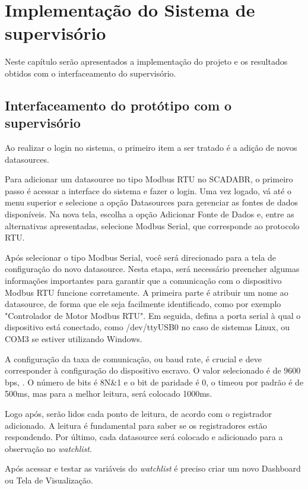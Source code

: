 \chapter[Implementação do sistema de supervisório]{Implementação do Sistema de supervisório}

Neste capítulo serão apresentados a implementação do projeto e os resultados obtidos com o interfaceamento do supervisório.


\section{Interfaceamento do protótipo com o supervisório}

Ao realizar o login no sistema, o primeiro item a ser tratado é a adição de novos datasources.

Para adicionar um datasource no tipo Modbus RTU no SCADABR, o primeiro passo é acessar a interface do sistema e fazer o login. Uma vez logado, vá até o menu superior e selecione a opção Datasources para gerenciar as fontes de dados disponíveis. Na nova tela, escolha a opção Adicionar Fonte de Dados e, entre as alternativas apresentadas, selecione Modbus Serial, que corresponde ao protocolo RTU.

Após selecionar o tipo Modbus Serial, você será direcionado para a tela de configuração do novo datasource. Nesta etapa, será necessário preencher algumas informações importantes para garantir que a comunicação com o dispositivo Modbus RTU funcione corretamente. A primeira parte é atribuir um nome ao datasource, de forma que ele seja facilmente identificado, como por exemplo "Controlador de Motor Modbus RTU". Em seguida, defina a porta serial à qual o dispositivo está conectado, como /dev/ttyUSB0 no caso de sistemas Linux, ou COM3 se estiver utilizando Windows.

A configuração da taxa de comunicação, ou baud rate, é crucial e deve corresponder à configuração do dispositivo escravo. O valor selecionado é de 9600 bps, . O número de bits é 8N\&1 e o bit de paridade é 0, o timeou por padrão é de 500ms, mas para a melhor leitura, será colocado 1000ms.

Logo após, serão lidos cada ponto de leitura, de acordo com o registrador adicionado. A leitura é fundamental para saber se os registradores estão respondendo. Por último, cada datasource será colocado e adicionado para a observação no \textit{watchlist}.

Após acessar e testar as variáveis do \textit{watchlist} é preciso criar um novo Dashboard ou Tela de Visualização.

